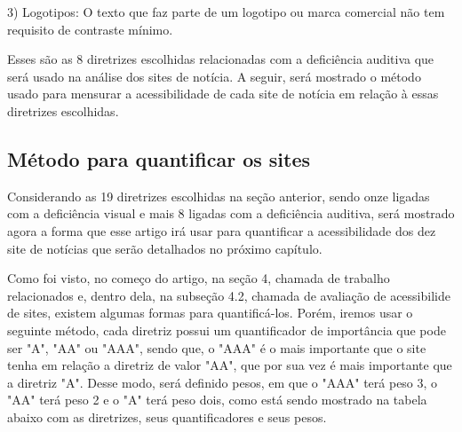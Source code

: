 \documentclass[a4paper]{article}
\begin{document}
\begin{titlepage}
\hspace{.1\textwidth} %
\begin{minipage}{.85\textwidth}
	3) Logotipos: O texto que faz parte de um logotipo ou marca comercial não tem requisito de contraste mínimo.\\
\end{minipage}

Esses são as 8 diretrizes escolhidas relacionadas com a deficiência auditiva que será usado na análise dos sites de notícia. A seguir, será mostrado o método usado para mensurar a acessibilidade de cada site de notícia em relação à essas diretrizes escolhidas.

\subsection{Método para quantificar os sites}

Considerando as 19 diretrizes escolhidas na seção anterior, sendo onze ligadas com a deficiência visual e mais 8 ligadas com a deficiência auditiva, será mostrado agora a forma que esse artigo irá usar para quantificar a acessibilidade dos dez site de notícias que serão detalhados no próximo capítulo.

Como foi visto, no começo do artigo, na seção 4, chamada de trabalho relacionados e, dentro dela, na subseção 4.2, chamada de avaliação de acessibilide de sites, existem algumas formas para quantificá-los. Porém, iremos usar o seguinte método, cada diretriz possui um quantificador de importância que pode ser "A", "AA" ou "AAA", sendo que, o "AAA" é o mais importante que o site tenha em relação a diretriz de valor "AA", que por sua vez é mais importante que a diretriz "A". Desse modo, será definido pesos, em que o "AAA" terá peso 3, o "AA" terá peso 2 e o "A" terá peso dois, como está sendo mostrado na tabela abaixo com as diretrizes, seus quantificadores e seus pesos.


\end{titlepage}
\end{document}
